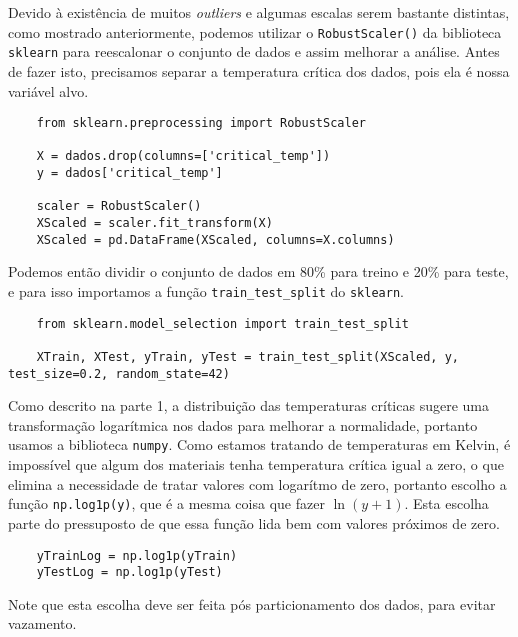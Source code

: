 Devido à existência de muitos \textit{outliers} e algumas escalas serem bastante distintas, como mostrado anteriormente, podemos utilizar o \verb|RobustScaler()| da biblioteca \verb|sklearn| para reescalonar o conjunto de dados e assim melhorar a análise. Antes de fazer isto, precisamos separar a temperatura crítica dos dados, pois ela é nossa variável alvo.
\begin{longlisting}
    \begin{verbatim}
    from sklearn.preprocessing import RobustScaler

    X = dados.drop(columns=['critical_temp'])
    y = dados['critical_temp']

    scaler = RobustScaler()
    XScaled = scaler.fit_transform(X)
    XScaled = pd.DataFrame(XScaled, columns=X.columns)
    \end{verbatim}
\end{longlisting}

Podemos então dividir o conjunto de dados em 80\% para treino e 20\% para teste, e para isso importamos a função \verb|train_test_split| do \verb|sklearn|.
\begin{longlisting}
    \begin{verbatim}
    from sklearn.model_selection import train_test_split

    XTrain, XTest, yTrain, yTest = train_test_split(XScaled, y, test_size=0.2, random_state=42)
    \end{verbatim}
\end{longlisting}

Como descrito na parte 1, a distribuição das temperaturas críticas sugere uma transformação logarítmica nos dados para melhorar a normalidade, portanto usamos a biblioteca \verb|numpy|. Como estamos tratando de temperaturas em Kelvin, é impossível que algum dos materiais tenha temperatura crítica igual a zero, o que elimina a necessidade de tratar valores com logarítmo de zero, portanto escolho a função \verb|np.log1p(y)|, que é a mesma coisa que fazer $\ln(y+1)$. Esta escolha parte do pressuposto de que essa função lida bem com valores próximos de zero.
\begin{longlisting}
    \begin{verbatim}
    yTrainLog = np.log1p(yTrain)
    yTestLog = np.log1p(yTest)
    \end{verbatim}
\end{longlisting}

Note que esta escolha deve ser feita pós particionamento dos dados, para evitar vazamento.